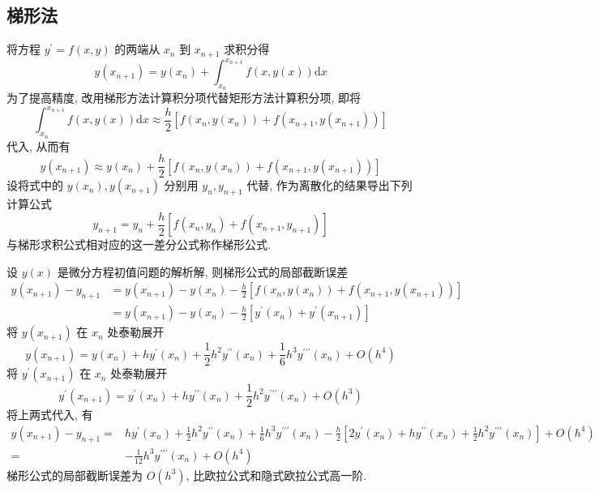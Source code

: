 \subsection{梯形法}
将方程 $ y^{\prime}=f(x, y) $ 的两端从 $ x_{n} $ 到 $ x_{n+1} $ 求积分得
$$
y\left(x_{n+1}\right)=y\left(x_{n}\right)+\int_{x_{n}}^{x_{n+1}} f(x, y(x)) \mathrm{d} x
$$
为了提高精度, 改用梯形方法计算积分项代替矩形方法计算积分项, 即将
$$
\int_{x_{n}}^{x_{n+1}} f(x, y(x)) \mathrm{d} x \approx \frac{h}{2}\left[f\left(x_{n}, y\left(x_{n}\right)\right)+f\left(x_{n+1}, y\left(x_{n+1}\right)\right)\right]
$$
代入, 从而有
$$
y\left(x_{n+1}\right) \approx y\left(x_{n}\right)+\frac{h}{2}\left[f\left(x_{n}, y\left(x_{n}\right)\right)+f\left(x_{n+1}, y\left(x_{n+1}\right)\right)\right]
$$
设将式中的 $ y\left(x_{n}\right), y\left(x_{n+1}\right) $ 分别用 $ y_{n}, y_{n+1} $ 代替, 作为离散化的结果导出下列计算公式
$$
y_{n+1}=y_{n}+\frac{h}{2}\left[f\left(x_{n}, y_{n}\right)+f\left(x_{n+1}, y_{n+1}\right)\right]
$$
与梯形求积公式相对应的这一差分公式称作梯形公式.

设 $ y(x) $ 是微分方程初值问题的解析解, 则梯形公式的局部截断误差
$$
\begin{aligned}
y\left(x_{n+1}\right)-y_{n+1} & =y\left(x_{n+1}\right)-y\left(x_{n}\right)-\frac{h}{2}\left[f\left(x_{n}, y\left(x_{n}\right)\right)+f\left(x_{n+1}, y\left(x_{n+1}\right)\right)\right] \\
& =y\left(x_{n+1}\right)-y\left(x_{n}\right)-\frac{h}{2}\left[y^{\prime}\left(x_{n}\right)+y^{\prime}\left(x_{n+1}\right)\right]
\end{aligned}
$$
将 $ y\left(x_{n+1}\right) $ 在 $ x_{n} $ 处泰勒展开
$$
y\left(x_{n+1}\right)=y\left(x_{n}\right)+h y^{\prime}\left(x_{n}\right)+\frac{1}{2} h^{2} y^{\prime \prime}\left(x_{n}\right)+\frac{1}{6} h^{3} y^{\prime \prime \prime}\left(x_{n}\right)+O\left(h^{4}\right)
$$
将 $ y^{\prime}\left(x_{n+1}\right) $ 在 $ x_{n} $ 处泰勒展开
$$
y^{\prime}\left(x_{n+1}\right)=y^{\prime}\left(x_{n}\right)+h y^{\prime \prime}\left(x_{n}\right)+\frac{1}{2} h^{2} y^{\prime \prime \prime}\left(x_{n}\right)+O\left(h^{3}\right)
$$
将上两式代入, 有
$$
\begin{aligned}
y\left(x_{n+1}\right)-y_{n+1}= & h y^{\prime}\left(x_{n}\right)+\frac{1}{2} h^{2} y^{\prime \prime}\left(x_{n}\right)+\frac{1}{6} h^{3} y^{\prime \prime \prime}\left(x_{n}\right)-\frac{h}{2}\left[2 y^{\prime}\left(x_{n}\right)+h y^{\prime \prime}\left(x_{n}\right)+\frac{1}{2} h^{2} y^{\prime \prime \prime}\left(x_{n}\right)\right]+O\left(h^{4}\right) \\
= & -\frac{1}{12} h^{3} y^{\prime \prime \prime}\left(x_{n}\right)+O\left(h^{4}\right)
\end{aligned}
$$
梯形公式的局部截断误差为 $ O\left(h^{3}\right) $, 比欧拉公式和隐式欧拉公式高一阶.

